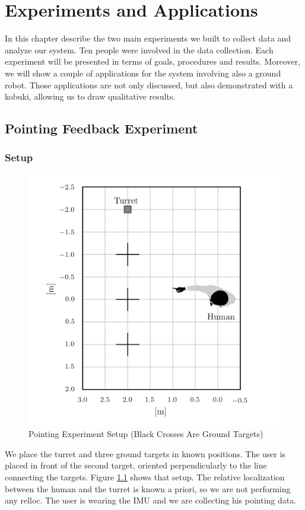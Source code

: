 \chapter{Experiments and Applications}\label{chap:4}
In this chapter describe the two main experiments we built to collect data and analyze our system. Ten people were involved in the data collection. Each experiment will be presented in terms of goals, procedures and results. Moreover, we will show a couple of applications for the system involving also a ground robot. Those applications are not only discussed, but also demonstrated with a kobuki, allowing us to draw qualitative results.
\section{Pointing Feedback Experiment}
\subsection{Setup}
\begin{figure}
	\centering
	\includegraphics[width=\textwidth]{img/pointingExpSetup.png}%
	\caption{Pointing Experiment Setup (Black Crosses Are Ground Targets)}
	\label{fig:pointingExpSetup}
\end{figure}
We place the turret and three ground targets in known positions. The user is placed in front of the second target, oriented perpendicularly to the line connecting the targets. Figure \ref{fig:pointingExpSetup} shows that setup. The relative localization between the human and the turret is known a priori, so we are not performing any relloc. The user is wearing the IMU and we are collecting his pointing data.\\
